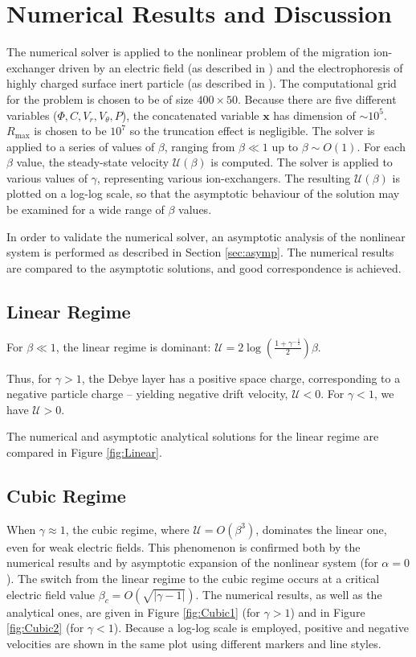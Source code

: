 \documentclass[10pt]{ijnam}
\newcommand{\pars}[1]{\left(#1\right)}
\newcommand\bx{\boldsymbol{x}}
\newcommand\cU{\mathscr{U}}
\begin{document}
\section{Numerical Results and Discussion} \label{sec:results}
The numerical solver is applied to the nonlinear problem of the migration ion-exchanger
driven by an electric field (as described in \cite{yariv2010migration})
and the electrophoresis of highly charged surface inert particle 
(as described in \cite{schnitzer2012surface}). 
The computational grid for the problem is chosen to be of size $400 \times 50$.
Because there are five different variables ($\varPhi, C, V_r, V_\theta, P$), the concatenated
variable $\bx$ has dimension of $\sim 10^5$.
$R_{\max}$ is chosen to be $10^{7}$ so the truncation effect is negligible.
The solver is applied to a series of values of $\beta$, ranging 
from $\beta \ll 1$ up to $\beta \sim O(1)$.
For each $\beta$ value, the steady-state velocity $\cU(\beta)$ is computed. The solver
is applied to various values of $\gamma$, representing various ion-exchangers.
The resulting $\cU(\beta)$ is plotted on a log-log scale, so that the asymptotic behaviour
of the solution may be examined for a wide range of $\beta$ values.

In order to validate the numerical solver, an asymptotic analysis of the nonlinear system
is performed as described in Section \ref{sec:asymp}. The numerical results are compared 
to the asymptotic solutions, and good correspondence is achieved.

\subsection{Linear Regime}
For $\beta \ll 1$, the linear regime is dominant: $\cU = 2\log\pars{\frac{1 + \gamma^{-\frac{1}{2}}}{2}}\beta$.

Thus, for $\gamma > 1$, the Debye layer has a positive space charge, corresponding to a negative
particle charge -- yielding negative drift velocity, $\cU < 0$. 
For $\gamma < 1$, we have $\cU > 0$.

The numerical and asymptotic analytical solutions for the linear regime are compared 
in Figure \ref{fig:Linear}.

\subsection{Cubic Regime}
When $\gamma \approx 1$, the cubic regime, where $\cU = O(\beta^3)$, 
dominates the linear one, even for weak electric fields. 
This phenomenon is confirmed both by the numerical
results and by asymptotic expansion of the nonlinear system (for $\alpha=0$).
The switch from the linear regime to the cubic regime occurs at a critical electric
field value $\beta_c = O(\sqrt{|\gamma - 1|})$.
The numerical results, as well as the analytical ones, are given in Figure
\ref{fig:Cubic1} (for $\gamma > 1$) and in Figure \ref{fig:Cubic2} (for $\gamma < 1$).
Because a log-log scale is employed, positive and negative velocities are shown in
the same plot using different markers and line styles.
\end{document}
